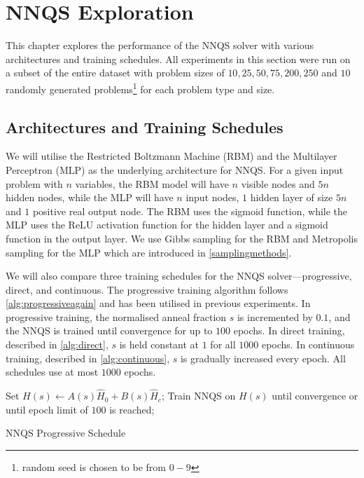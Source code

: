 \chapter{NNQS Exploration}\label{nnqsresults}
This chapter explores the performance of the NNQS solver with various architectures and training schedules. All experiments in this section were run on a subset of the entire dataset with problem sizes of $10,25,50,75,200,250$ and $10$ randomly generated problems\footnote{random seed is chosen to be from $0-9$} for each problem type and size. 


\section{Architectures and Training Schedules}
We will utilise the Restricted Boltzmann Machine (RBM) and the Multilayer Perceptron (MLP) as the underlying architecture for NNQS. For a given input problem with $n$ variables, the RBM model will have $n$ visible nodes and $5n$ hidden nodes, while the MLP will have $n$ input nodes, $1$ hidden layer of size $5n$ and $1$ positive real output node. The RBM uses the sigmoid function, while the MLP uses the ReLU activation function for the hidden layer and a sigmoid function in the output layer. We use Gibbs sampling for the RBM and Metropolis sampling for the MLP which are introduced in \autoref{samplingmethods}.

We will also compare three training schedules for the NNQS solver---progressive, direct, and continuous. The progressive training algorithm follows \autoref{alg:progressiveagain} and has been utilised in previous experiments. In progressive training, the normalised anneal fraction $s$ is incremented by $0.1$, and the NNQS is trained until convergence for up to $100$ epochs. In direct training, described in \autoref{alg:direct}, $s$ is held constant at $1$ for all $1000$ epochs. In continuous training, described in \autoref{alg:continuous}, $s$ is gradually increased every epoch. All schedules use at most $1000$ epochs.

\begin{algorithm}
    \begin{algorithmic}
    \State Set $H(s) \leftarrow A(s)\hat{H}_0 + B(s)\hat{H}_c$;
    \State Train NNQS on $H(s)$ until convergence or until epoch limit of $100$ is reached;
    \EndFor
    \end{algorithmic}
    \caption{NNQS Progressive Schedule}
    \label{alg:progressiveagain}
\end{algorithm}

